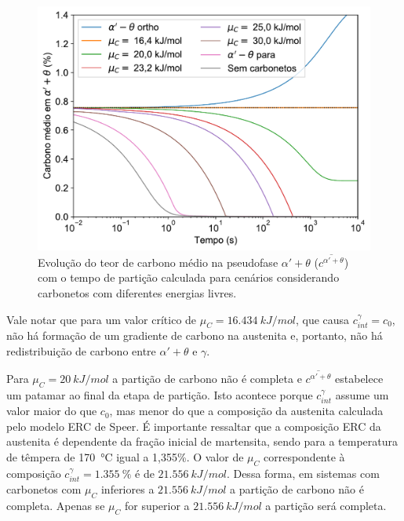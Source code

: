 \begin{figure}
  \includegraphics[height=.6\textwidth]{img/cpartition/nobainite_cavg.pdf}
  \caption{Evolução do teor de carbono médio na pseudofase $\alpha' + \theta$ ($\overline{c^{\alpha' + \theta}}$) com o tempo de partição calculada para cenários considerando carbonetos com diferentes energias livres.}
  \label{fig:nobainite_cavg}
\end{figure}

Vale notar que para um valor crítico de $\mu_C = \SI{16.434}{kJ/mol}$, que causa $c^\gamma_{int} = c_0$, não há formação de um gradiente de carbono na austenita e, portanto, não há redistribuição de carbono entre $\alpha' + \theta$ e $\gamma$.

Para $\mu_C = \SI{20}{kJ/mol}$ a partição de carbono não é completa e $\overline{c^{\alpha' + \theta}}$ estabelece um patamar ao final da etapa de partição. Isto acontece porque $c^\gamma_{int}$ assume um valor maior do que $c_0$, mas menor do que a composição da austenita calculada pelo modelo ERC de Speer. 
É importante ressaltar que a composição ERC da austenita é dependente da fração inicial de martensita, sendo para a temperatura de têmpera de \SI{170}{\degreeCelsius} igual a 1,355\%. O valor de $\mu_C$ correspondente à composição $c^\gamma_{int} = \SI{1.355}{\%}$ é de $\SI{21.556}{kJ/mol}$. Dessa forma, em sistemas com carbonetos com $\mu_C$ inferiores a $\SI{21.556}{kJ/mol}$ a partição de carbono não é completa. Apenas se $\mu_C$ for superior a $\SI{21.556}{kJ/mol}$ a partição será completa.


